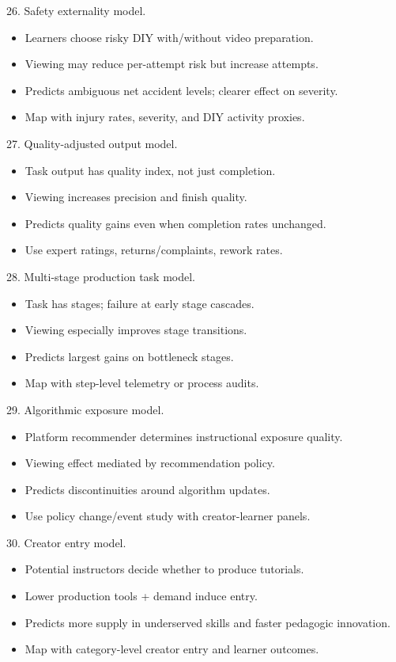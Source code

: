 \documentclass[11pt]{article}
\begin{document}
26. Safety externality model.\\
\begin{itemize}
\item Learners choose risky DIY with/without video preparation.
\item Viewing may reduce per-attempt risk but increase attempts.
\item Predicts ambiguous net accident levels; clearer effect on severity.
\item Map with injury rates, severity, and DIY activity proxies.
\end{itemize}

27. Quality-adjusted output model.\\
\begin{itemize}
\item Task output has quality index, not just completion.
\item Viewing increases precision and finish quality.
\item Predicts quality gains even when completion rates unchanged.
\item Use expert ratings, returns/complaints, rework rates.
\end{itemize}

28. Multi-stage production task model.\\
\begin{itemize}
\item Task has stages; failure at early stage cascades.
\item Viewing especially improves stage transitions.
\item Predicts largest gains on bottleneck stages.
\item Map with step-level telemetry or process audits.
\end{itemize}

29. Algorithmic exposure model.\\
\begin{itemize}
\item Platform recommender determines instructional exposure quality.
\item Viewing effect mediated by recommendation policy.
\item Predicts discontinuities around algorithm updates.
\item Use policy change/event study with creator-learner panels.
\end{itemize}

30. Creator entry model.\\
\begin{itemize}
\item Potential instructors decide whether to produce tutorials.
\item Lower production tools + demand induce entry.
\item Predicts more supply in underserved skills and faster pedagogic innovation.
\item Map with category-level creator entry and learner outcomes.
\end{itemize}
\end{document}
